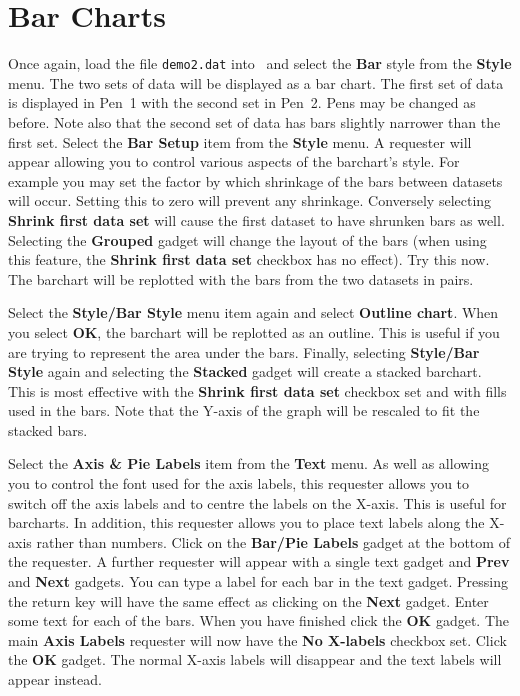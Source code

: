 \section{Bar Charts}
\label{sect:bar}
Once again, load the file {\tt demo2.dat} into \amplot\ and 
select the {\bf Bar} style from the {\bf Style} menu. The two sets of data will 
be displayed as a bar chart. The first set of data is displayed in  Pen~1 with the 
second set in Pen~2. Pens may be changed as before. Note also that the second set 
of data has bars slightly narrower than the first set. Select the {\bf Bar Setup} 
item from the {\bf Style} menu. A requester will appear allowing 
you to control various aspects of the barchart's style. For example you may set the 
factor by which shrinkage of the bars between datasets will 
occur. Setting this to zero will prevent any shrinkage. Conversely selecting 
{\bf Shrink first data set}  will cause the first dataset to 
have shrunken bars as well.
Selecting the {\bf Grouped}  gadget will change the layout of 
the bars (when using this feature, the {\bf Shrink first data set} checkbox has
no effect). Try this now. The barchart will be replotted with the bars from the 
two datasets in pairs.

Select the {\bf Style/Bar Style} menu item again and select {\bf Outline 
chart}. When you select {\bf OK}, the barchart will be replotted 
as an outline. This is useful if you are trying to represent the area under the bars.
Finally, selecting {\bf Style/Bar Style} again and selecting the {\bf Stacked} 
gadget will create a stacked barchart. This is most effective with the {\bf Shrink 
first data set} checkbox set and with fills used in the bars. Note that the Y-axis 
of the graph will be rescaled to fit the stacked bars.

Select the {\bf Axis \& Pie Labels} item from the {\bf Text} menu.
As well as allowing you to control the font used for the axis labels, this requester 
allows you to switch off the axis labels and to centre the labels on the X-axis. 
This is useful for barcharts. In addition, this requester allows you to place text 
labels along the X-axis rather than numbers. Click on the {\bf Bar/Pie Labels }
gadget at the bottom of the requester. A further requester will appear with a single 
text gadget and {\bf Prev} and {\bf Next} gadgets. You can type a label for each bar 
in the text gadget. Pressing the return key will have the same effect as clicking on 
the {\bf Next} gadget. Enter some text for each of the bars. When you have finished 
click the {\bf OK} gadget. The main {\bf Axis Labels} requester will now have the 
{\bf No X-labels} checkbox set. Click the {\bf OK} gadget. The normal X-axis labels 
will disappear and the text labels will appear instead.

